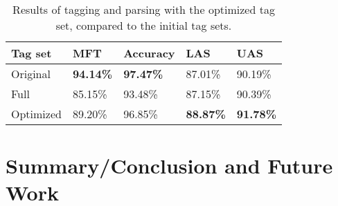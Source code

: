 \documentclass[11pt,a4paper]{article}
\begin{document}
\begin{table}
    \centering
    \smaller[0.5]
    \begin{tabular}{@{}lllll@{}}
        \toprule
        \textbf{Tag set} & \textbf{MFT} & \textbf{Accuracy} &
        \textbf{LAS} & \textbf{UAS} \\
        \midrule
        Original & \textbf{94.14\%} & \textbf{97.47\%} & 87.01\% & 90.19\% \\
        Full & 85.15\% & 93.48\% & 87.15\% & 90.39\% \\
        Optimized & 89.20\% & 96.85\% & \textbf{88.87\%} & \textbf{91.78\%} \\
        \bottomrule
    \end{tabular}
    \caption{Results of tagging and parsing with the optimized tag set,
        compared to the initial tag sets.}
    \label{finalresults}
\end{table}


\section{Summary/Conclusion and Future Work}
\label{sec:summary}




\end{document}
